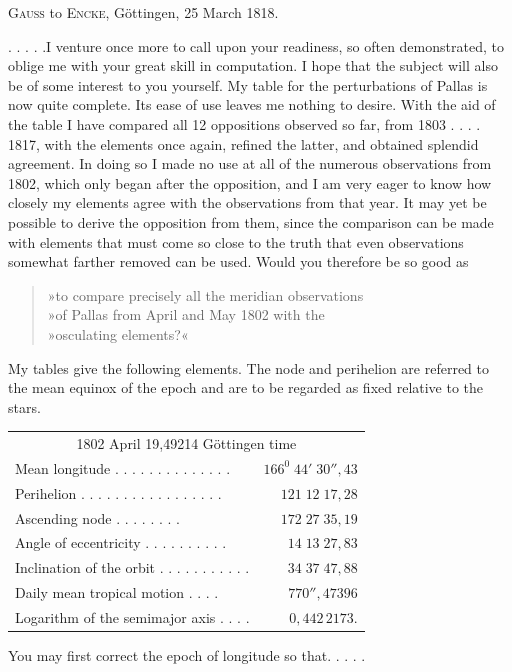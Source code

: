 \par{}\bigskip
\begin{center}
\textsc{Gauss} to \textsc{Encke}, Göttingen, 25 March 1818.
\end{center}
\noindent\hspace*{\parindent}. . . . .\quad I venture once more to call upon your readiness, so often demonstrated, to oblige me with your great skill in computation. I hope that the subject will also be of some interest to you yourself. My table for the perturbations of Pallas is now quite complete. Its ease of use leaves me nothing to desire. With the aid of the table I have compared all 12 oppositions observed so far, from 1803 . . . . 1817, with the elements once again, refined the latter, and obtained splendid agreement. In doing so I made no use at all of the numerous observations from 1802, which only began after the opposition, and I am very eager to know how closely my elements agree with the observations from that year. It may yet be possible to derive the opposition from them, since the comparison can be made with elements that must come so close to the truth that even observations somewhat farther removed can be used. Would you therefore be so good as
\begin{quote}
»to compare precisely all the meridian observations\\
»of Pallas from April and May 1802 with the\\
»osculating elements?«
\end{quote}
\par My tables give the following elements. The node and perihelion are referred to the mean equinox of the epoch and are to be regarded as fixed relative to the stars.
\begin{center}
\begingroup\small\setlength{\tabcolsep}{4pt}
\begin{tabular}{@{}lr@{}}
\multicolumn{2}{c}{1802 April 19,49214 Göttingen time}\\[3pt]
Mean longitude . . . . . . . . . . . . . .&\(166^0\;44'\;30''{,}43\)\\
Perihelion . . . . . . . . . . . . . . . . .&\(121\;12\;17{,}28\)\\
Ascending node . . . . . . . .&\(172\;27\;35{,}19\)\\
Angle of eccentricity . . . . . . . . . .&\(14\;13\;27{,}83\)\\
Inclination of the orbit . . . . . . . . . . .&\(34\;37\;47{,}88\)\\
Daily mean tropical motion . . . .&\(770''{,}47396\)\\
Logarithm of the semimajor axis . . . .&\(0{,}442\,2173.\)
\end{tabular}
\endgroup
\end{center}
\noindent You may first correct the epoch of longitude so that\quad . . . . .
\par
